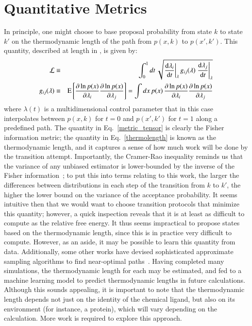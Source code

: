 \section{Quantitative Metrics}
%
In principle, one might choose to base proposal probability from state $k$ to state $k'$ on the thermodynamic length of the path from $p(x, k)$ to $p(x', k')$. This quantity, described at length in \cite{Crooks2007, Sivak2012,Zulkowski2012}, is given by:
\begin{eqnarray}
\mathcal{L} &\equiv& \int_{0}^{1} dt \, \sqrt{\left.\dv{\lambda_i}{t}\right|_\lambda g_{ij}(\lambda) \left.\dv{ \lambda_j}{t} \right|_\lambda} \label{thermolength} \\
g_{ij} (\lambda) &\equiv& \mathrm{E} \left[ \pdv{\ln p(x)}{\lambda_i} \pdv{\ln p(x)}{\lambda_j} \right] = \int dx \, p(x) \, \pdv{\ln p(x)}{\lambda_i} \pdv{\ln p(x)}{\lambda_j} \label{metric_tensor}
\end{eqnarray}
%
where $\lambda(t)$ is a multidimensional control parameter that in this case interpolates between $p(x,k)$ for $t=0$ and $p(x', k')$ for $t=1$ along a predefined path. 
%
The quantity in Eq.~\ref{metric_tensor} is clearly the Fisher information metric; the quantity in Eq.~\ref{thermolength} is known as the thermodynamic length, and it captures a sense of how much work will be done by the transition attempt.
%
Importantly, the Cramer-Rao inequality reminds us that the variance of any unbiased estimator is lower-bounded by the inverse of the Fisher information~\cite{Rao1992}; to put this into terms relating to this work, the larger the differences between distributions in each step of the transition from $k$ to $k'$, the higher the lower bound on the variance of the acceptance probability.
%
It seems intuitive then that we would want to choose transition protocols that minimize this quantity; however, a quick inspection reveals that it is at least as difficult to compute as the relative free energy.
%
It thus seems impractical to propose states based on the thermodynamic length, since this is in practice very difficult to compute.
%
However, as an aside, it may be possible to learn this quantity from data.
%
Additionally, some other works have devised sophisticated approximate sampling algorithms to find near-optimal paths~\cite{Gingrich2016}.
%
Having completed many simulations, the thermodynamic length for each may be estimated, and fed to a machine learning model to predict thermodynamic lengths in future calculations.
%
Although this sounds appealing, it is important to note that the thermodynamic length depends not just on the identity of the chemical ligand, but also on its environment (for instance, a protein), which will vary depending on the calculation.
%
More work is required to explore this approach.
%
